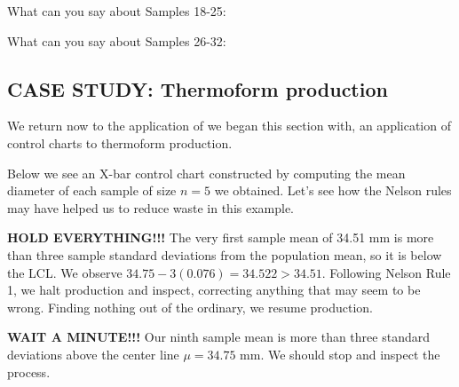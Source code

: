 \documentclass{ximera}
\begin{document}
\begin{problem}
What can you say about Samples  18-25:
\begin{multipleChoice}
\end{multipleChoice}

What can you say about Samples  26-32:
\begin{multipleChoice}
\end{multipleChoice}
\end{problem}

\subsection*{CASE STUDY: Thermoform production}

We return now to the application of we began this section with, an application of control charts to thermoform production.

Below we see an X-bar control chart constructed by computing the mean diameter of each sample of size $n=5$ we obtained.  Let's see how the Nelson rules may have helped us to reduce waste in this example.


\textbf{HOLD EVERYTHING!!!}  The very first sample mean of 34.51 mm is more than three sample standard deviations from the population mean, so it is below the LCL.  We observe $34.75 - 3(0.076)=34.522>34.51$.  Following Nelson Rule 1, we halt production and inspect, correcting anything that may seem to be wrong.  Finding nothing out of the ordinary, we resume production.

\textbf{WAIT A MINUTE!!!}  Our ninth sample mean is more than three standard deviations above the center line $\mu=34.75$ mm.  We should stop and inspect the process.
\end{document}

